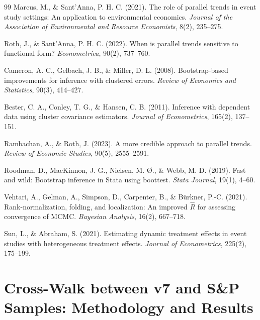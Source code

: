 \documentclass[11pt,a4paper]{article}
\begin{document}
\begin{thebibliography}{99}
Marcus, M., \& Sant'Anna, P. H. C. (2021).
\newblock The role of parallel trends in event study settings: An application to environmental economics.
\newblock \textit{Journal of the Association of Environmental and Resource Economists}, 8(2), 235--275.

Roth, J., \& Sant'Anna, P. H. C. (2022).
\newblock When is parallel trends sensitive to functional form?
\newblock \textit{Econometrica}, 90(2), 737--760.

Cameron, A. C., Gelbach, J. B., \& Miller, D. L. (2008).
\newblock Bootstrap-based improvements for inference with clustered errors.
\newblock \textit{Review of Economics and Statistics}, 90(3), 414--427.

Bester, C. A., Conley, T. G., \& Hansen, C. B. (2011).
\newblock Inference with dependent data using cluster covariance estimators.
\newblock \textit{Journal of Econometrics}, 165(2), 137--151.

Rambachan, A., \& Roth, J. (2023).
\newblock A more credible approach to parallel trends.
\newblock \textit{Review of Economic Studies}, 90(5), 2555--2591.

Roodman, D., MacKinnon, J. G., Nielsen, M. \O., \& Webb, M. D. (2019).
\newblock Fast and wild: Bootstrap inference in Stata using boottest.
\newblock \textit{Stata Journal}, 19(1), 4--60.

Vehtari, A., Gelman, A., Simpson, D., Carpenter, B., \& Bürkner, P.-C. (2021).
\newblock Rank-normalization, folding, and localization: An improved $\hat{R}$ for assessing convergence of MCMC.
\newblock \textit{Bayesian Analysis}, 16(2), 667--718.

Sun, L., \& Abraham, S. (2021).
\newblock Estimating dynamic treatment effects in event studies with heterogeneous treatment effects.
\newblock \textit{Journal of Econometrics}, 225(2), 175--199.

\end{thebibliography}


\appendix

\section{Cross-Walk between v7 and S\&P Samples: Methodology and Results}
\label{app:matching}
\end{document}
